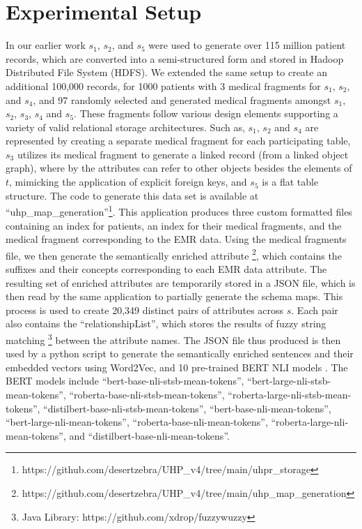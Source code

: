 \documentclass{ieeeaccess}
\begin{document}
\section{Experimental Setup}
\label{experimentalSetup}
In our earlier work \cite{Satti2020} $s_1$, $s_2$, and $s_5$ were used to generate over 115 million patient records, which are converted into a semi-structured form and stored in Hadoop Distributed File System (HDFS). We extended the same setup to create an additional 100,000 records, for 1000 patients with 3 medical fragments for $s_1$, $s_2$, and $s_4$, and 97 randomly selected and generated medical fragments amongst $s_1$, $s_2$, $s_3$, $s_4$ and $s_5$. These fragments follow various design elements supporting a variety of valid relational storage architectures. Such as, $s_1$, $s_2$ and $s_4$ are represented by creating a separate medical fragment for each participating table, $s_3$ utilizes its medical fragment to generate a linked record (from a linked object graph), where by the attributes can refer to other objects besides the elements of $t$, mimicking the application of explicit foreign keys, and $s_5$ is a flat table structure. The code to generate this data set is available at ``uhp\_map\_generation''\footnote{https://github.com/desertzebra/UHP\_v4/tree/main/uhpr\_storage}. This application produces three custom formatted files containing an index for patients, an index for their medical fragments, and the medical fragment corresponding to the EMR data. Using the medical fragments file, we then generate the semantically enriched attribute \footnote{https://github.com/desertzebra/UHP\_v4/tree/main/uhp\_map\_generation}, which contains the suffixes and their concepts corresponding to each EMR data attribute. The resulting set of enriched attributes are temporarily stored in a JSON file, which is then read by the same application to partially generate the schema maps. This process is used to create 20,349 distinct pairs of attributes across $s$. Each pair also contains the ``relationshipList'', which stores the results of fuzzy string matching\cite{FuzzyWuzzy} \footnote{Java Library: https://github.com/xdrop/fuzzywuzzy} between the attribute names. 
The JSON file thus produced is then used by a python script to generate the semantically enriched sentences and their embedded vectors using Word2Vec, and 10 pre-trained BERT NLI models \cite{reimers-2019-sentence-bert}. The BERT models include ``bert-base-nli-stsb-mean-tokens'', ``bert-large-nli-stsb-mean-tokens'', ``roberta-base-nli-stsb-mean-tokens'', ``roberta-large-nli-stsb-mean-tokens'', ``distilbert-base-nli-stsb-mean-tokens'', ``bert-base-nli-mean-tokens'', ``bert-large-nli-mean-tokens'', ``roberta-base-nli-mean-tokens'', ``roberta-large-nli-mean-tokens'', and ``distilbert-base-nli-mean-tokens''. 
\end{document}
